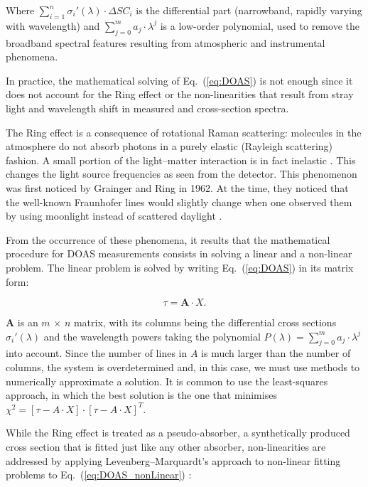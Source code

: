 Where $\sum_{i = 1}^{n} \sigma_{i}{'}(\lambda) \cdot \Delta SC_{i}$ is
the differential part (narrowband, rapidly varying with wavelength) and
$\sum_{j = 0}^{m} a_{j} \cdot \lambda^{j}$ is a low-order polynomial,
used to remove the broadband spectral features resulting from
atmospheric and instrumental phenomena.


In practice, the mathematical solving of Eq.~(\ref{eq:DOAS}) is not
enough since it does not account for the Ring effect or the
non-linearities that result from stray light and wavelength shift in
measured and cross-section spectra.

The Ring effect is a consequence of rotational Raman scattering:
molecules in the atmosphere do not absorb photons in a purely elastic
(Rayleigh scattering) fashion. A small portion of the light--matter
interaction is in fact inelastic \cite{Brinkmann1968,Merlaud2013}. This
changes the light source frequencies as seen from the detector. This
phenomenon was first noticed by Grainger and Ring in 1962. At the time,
they noticed that the well-known Fraunhofer lines would slightly change
when one  observed them by using moonlight instead of scattered daylight
\cite{GRAINGER1962}.

From the occurrence of these phenomena, it results that the mathematical
procedure for DOAS measurements consists in solving a linear and a
non-linear problem. The linear problem is solved by writing
Eq.~(\ref{eq:DOAS}) in its matrix form:

\begin{equation}
      \label{eq:DOAS_matrix}
      \tau = \mathbf{A} \cdot X.
\end{equation}

$\mathbf{A}$ is an $m\,\times\,n$ matrix, with its columns being the
differential cross sections $\sigma_{i}{'}(\lambda)$ and the wavelength
powers taking the polynomial $P(\lambda) = \sum_{j = 0}^{m} a_{j} \cdot
\lambda^{j}$ into account. Since the number of lines in $A$ is much
larger than the number of columns, the system is overdetermined and, in
this case, we must use methods to numerically approximate a solution. It
is common to use the least-squares approach, in which the best solution
is the one that minimises $\chi^{2} = \left[\tau - A \cdot X\right]
\cdot \left[\tau - A \cdot X\right]^{T}$.

While the Ring effect is treated as a pseudo-absorber, a synthetically
produced~\cite{Chance1997} cross section that is fitted just like any
other absorber, non-linearities are addressed by applying
Levenberg--Marquardt's approach to non-linear fitting problems to
Eq.~(\ref{eq:DOAS_nonLinear}) \cite{Merlaud2013,Press2007}:


